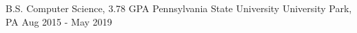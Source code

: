 \begin{cventries}
  \cventryEdu
    {B.S. Computer Science, 3.78 GPA}
    {Pennsylvania State University}
    {University Park, PA}
    {Aug 2015 - May 2019}
\end{cventries}
